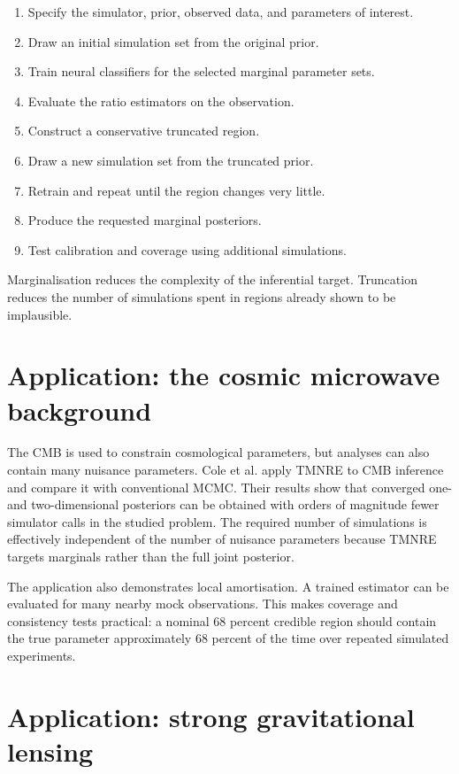 ﻿\documentclass[13pt,a4paper]{article}
\begin{document}
\begin{enumerate}
\item Specify the simulator, prior, observed data, and parameters of interest.
\item Draw an initial simulation set from the original prior.
\item Train neural classifiers for the selected marginal parameter sets.
\item Evaluate the ratio estimators on the observation.
\item Construct a conservative truncated region.
\item Draw a new simulation set from the truncated prior.
\item Retrain and repeat until the region changes very little.
\item Produce the requested marginal posteriors.
\item Test calibration and coverage using additional simulations.
\end{enumerate}

Marginalisation reduces the complexity of the inferential target. Truncation reduces the number of simulations spent in regions already shown to be implausible.

\section*{Application: the cosmic microwave background}

The CMB is used to constrain cosmological parameters, but analyses can also contain many nuisance parameters. Cole et al. apply TMNRE to CMB inference and compare it with conventional MCMC. Their results show that converged one- and two-dimensional posteriors can be obtained with orders of magnitude fewer simulator calls in the studied problem. The required number of simulations is effectively independent of the number of nuisance parameters because TMNRE targets marginals rather than the full joint posterior.

The application also demonstrates local amortisation. A trained estimator can be evaluated for many nearby mock observations. This makes coverage and consistency tests practical: a nominal 68 percent credible region should contain the true parameter approximately 68 percent of the time over repeated simulated experiments.

\section*{Application: strong gravitational lensing}
\end{document}
